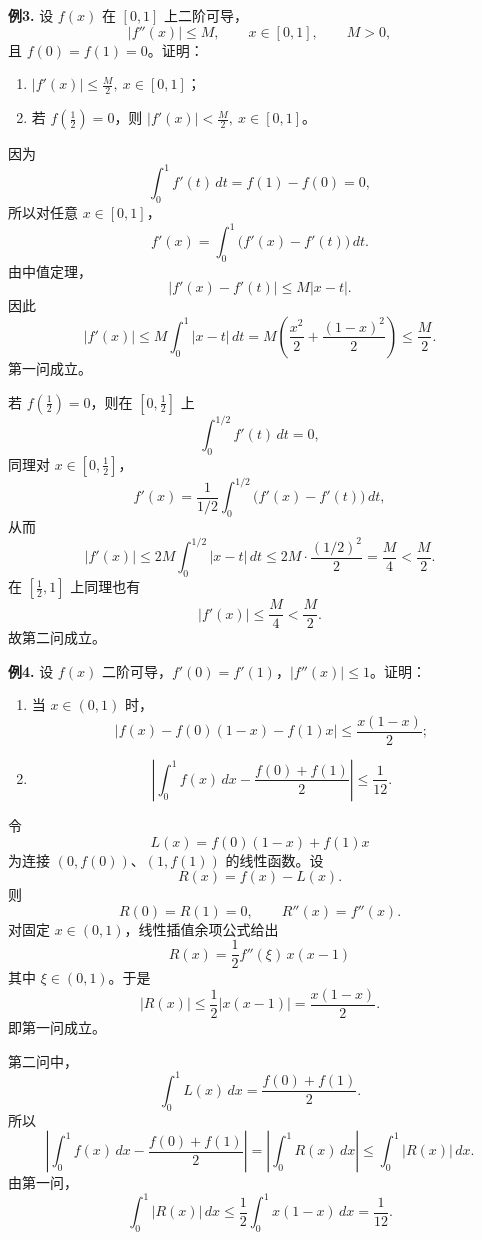 \begin{problemblock}
\textbf{例3.} 设 \(f(x)\) 在 \([0,1]\) 上二阶可导，
\[
|f''(x)|\le M,\qquad x\in[0,1],\qquad M>0,
\]
且 \(f(0)=f(1)=0\)。证明：
\begin{enumerate}[label=(\arabic*), leftmargin=2.2em]
\item \(|f'(x)|\le\frac M2,\ x\in[0,1]\)；
\item 若 \(f\left(\frac12\right)=0\)，则 \(|f'(x)|<\frac M2,\ x\in[0,1]\)。
\end{enumerate}
\end{problemblock}
\begin{solutionblock}
因为
\[
\int_0^1 f'(t)\,dt=f(1)-f(0)=0,
\]
所以对任意 \(x\in[0,1]\)，
\[
f'(x)=\int_0^1\bigl(f'(x)-f'(t)\bigr)\,dt.
\]
由中值定理，
\[
|f'(x)-f'(t)|\le M|x-t|.
\]
因此
\[
|f'(x)|
\le M\int_0^1 |x-t|\,dt
=M\left(\frac{x^2}{2}+\frac{(1-x)^2}{2}\right)
\le\frac M2.
\]
第一问成立。

若 \(f\left(\frac12\right)=0\)，则在 \([0,\frac12]\) 上
\[
\int_0^{1/2} f'(t)\,dt=0,
\]
同理对 \(x\in[0,\frac12]\)，
\[
f'(x)=\frac{1}{1/2}\int_0^{1/2}\bigl(f'(x)-f'(t)\bigr)\,dt,
\]
从而
\[
|f'(x)|
\le 2M\int_0^{1/2}|x-t|\,dt
\le 2M\cdot\frac{(1/2)^2}{2}
=\frac M4<\frac M2.
\]
在 \([\frac12,1]\) 上同理也有
\[
|f'(x)|\le\frac M4<\frac M2.
\]
故第二问成立。
\end{solutionblock}

\begin{problemblock}
\textbf{例4.} 设 \(f(x)\) 二阶可导，\(f'(0)=f'(1)\)，\(|f''(x)|\le1\)。证明：
\begin{enumerate}[label=(\arabic*), leftmargin=2.2em]
\item 当 \(x\in(0,1)\) 时，
\[
\left|f(x)-f(0)(1-x)-f(1)x\right|
\le\frac{x(1-x)}2;
\]
\item
\[
\left|\int_0^1 f(x)\,dx-\frac{f(0)+f(1)}2\right|
\le\frac1{12}.
\]
\end{enumerate}
\end{problemblock}
\begin{solutionblock}
令
\[
L(x)=f(0)(1-x)+f(1)x
\]
为连接 \((0,f(0))\)、\((1,f(1))\) 的线性函数。设
\[
R(x)=f(x)-L(x).
\]
则
\[
R(0)=R(1)=0,\qquad R''(x)=f''(x).
\]
对固定 \(x\in(0,1)\)，线性插值余项公式给出
\[
R(x)=\frac12 f''(\xi)\,x(x-1)
\]
其中 \(\xi\in(0,1)\)。于是
\[
|R(x)|\le\frac12|x(x-1)|=\frac{x(1-x)}2.
\]
即第一问成立。

第二问中，
\[
\int_0^1 L(x)\,dx=\frac{f(0)+f(1)}2.
\]
所以
\[
\left|\int_0^1 f(x)\,dx-\frac{f(0)+f(1)}2\right|
=\left|\int_0^1 R(x)\,dx\right|
\le\int_0^1 |R(x)|\,dx.
\]
由第一问，
\[
\int_0^1 |R(x)|\,dx
\le \frac12\int_0^1 x(1-x)\,dx
=\frac1{12}.
\]
\end{solutionblock}

